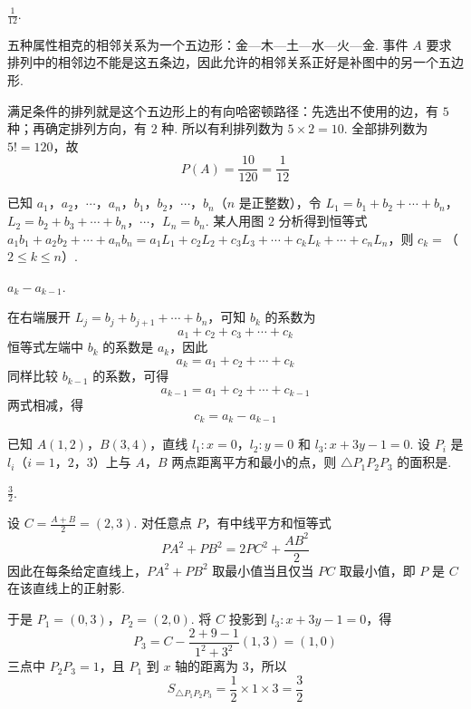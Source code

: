 \begin{answer}
\(\frac{1}{12}\).
\end{answer}

\begin{solution}
五种属性相克的相邻关系为一个五边形：金—木—土—水—火—金. 事件 \(A\) 要求排列中的相邻边不能是这五条边，因此允许的相邻关系正好是补图中的另一个五边形.

满足条件的排列就是这个五边形上的有向哈密顿路径：先选出不使用的边，有 \(5\) 种；再确定排列方向，有 \(2\) 种. 所以有利排列数为 \(5\times2=10\). 全部排列数为 \(5!=120\)，故
\[
P(A)=\frac{10}{120}=\frac1{12}
\]
\end{solution}

\begin{problem}
已知 \(a_1\)，\(a_2\)，\(\cdots\)，\(a_n\)，\(b_1\)，\(b_2\)，\(\cdots\)，\(b_n\)（\(n\) 是正整数），令 \(L_1=b_1+b_2+\cdots+b_n\)，\(L_2=b_2+b_3+\cdots+b_n\)，\(\cdots\)，\(L_n=b_n\). 某人用图 \(2\) 分析得到恒等式 \(a_1b_1+a_2b_2+\cdots+a_nb_n=a_1L_1+c_2L_2+c_3L_3+\cdots+c_kL_k+\cdots+c_nL_n\)，则 \(c_k=\)\fillinblank{}（\(2\leqslant k\leqslant n\)）.

\end{problem}

\begin{answer}
\(a_k-a_{k-1}\).
\end{answer}

\begin{solution}
在右端展开 \(L_j=b_j+b_{j+1}+\cdots+b_n\)，可知 \(b_k\) 的系数为
\[
a_1+c_2+c_3+\cdots+c_k
\]
恒等式左端中 \(b_k\) 的系数是 \(a_k\)，因此
\[
a_k=a_1+c_2+\cdots+c_k
\]
同样比较 \(b_{k-1}\) 的系数，可得
\[
a_{k-1}=a_1+c_2+\cdots+c_{k-1}
\]
两式相减，得
\[
c_k=a_k-a_{k-1}
\]
\end{solution}

\begin{problem}
已知 \(A(1,2)\)，\(B(3,4)\)，直线 \(l_1:x=0\)，\(l_2:y=0\) 和 \(l_3:x+3y-1=0\). 设 \(P_i\) 是 \(l_i\)（\(i=1\)，\(2\)，\(3\)）上与 \(A\)，\(B\) 两点距离平方和最小的点，则 \(\triangle P_1P_2P_3\) 的面积是\fillinblank{}.
\end{problem}

\begin{answer}
\(\frac{3}{2}\).
\end{answer}

\begin{solution}
设 \(C=\frac{A+B}{2}=(2,3)\). 对任意点 \(P\)，有中线平方和恒等式
\[
PA^2+PB^2=2PC^2+\frac{AB^2}{2}
\]
因此在每条给定直线上，\(PA^2+PB^2\) 取最小值当且仅当 \(PC\) 取最小值，即 \(P\) 是 \(C\) 在该直线上的正射影.

于是
\(P_1=(0,3)\)，\(P_2=(2,0)\).
将 \(C\) 投影到 \(l_3:x+3y-1=0\)，得
\[
P_3=C-\frac{2+9-1}{1^2+3^2}(1,3)=(1,0)
\]
三点中 \(P_2P_3=1\)，且 \(P_1\) 到 \(x\) 轴的距离为 \(3\)，所以
\[
S_{\triangle P_1P_2P_3}=\frac12\times1\times3=\frac32
\]
\end{solution}

